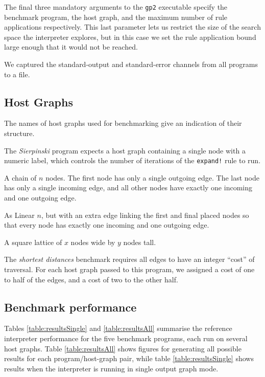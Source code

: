 The final three mandatory arguments to the \texttt{gp2} executable specify the benchmark program, the host graph, and the maximum number of rule applications respectively. This last parameter lets us restrict the size of the search space the interpreter explores, but in this case we set the rule application bound large enough that it would not be reached.

We captured the standard-output and standard-error channels from all programs to a file.

\subsection{Host Graphs}
\label{subsec:hosts}

The names of host graphs used for benchmarking give an indication of their structure.

\begin{description}
	\setlength\itemsep{-0.2em}
	\item[Gen $n$] The \textit{Sierpinski} program expects a host graph containing a single node with a numeric label, which controls the number of iterations of the \texttt{expand!} rule to run.

	\item[Linear $n$] A chain of $n$ nodes. The first node has only a single outgoing edge. The last node has only a single incoming edge, and all other nodes have exactly one incoming and one outgoing edge.

	\item[Cyclic $n$] As Linear $n$, but with an extra edge linking the first and final placed nodes so that every node has exactly one incoming and one outgoing edge.

	\item[$x \times y$ Grid] A square lattice of $x$ nodes wide by $y$ nodes tall.
\end{description}

The \textit{shortest distances} benchmark requires all edges to have an integer ``cost'' of traversal. For each host graph passed to this program, we assigned a cost of one to half of the edges, and a cost of two to the other half.



\subsection{Benchmark performance}\label{sec:benchperf}

Tables \ref{table:resultsSingle} and \ref{table:resultsAll} summarise the reference interpreter performance for the five benchmark programs, each run on several host graphs. Table \ref{table:resultsAll} shows figures for generating all possible results for each program/host-graph pair, while table \ref{table:resultsSingle} shows results when the interpreter is running in single output graph mode.




